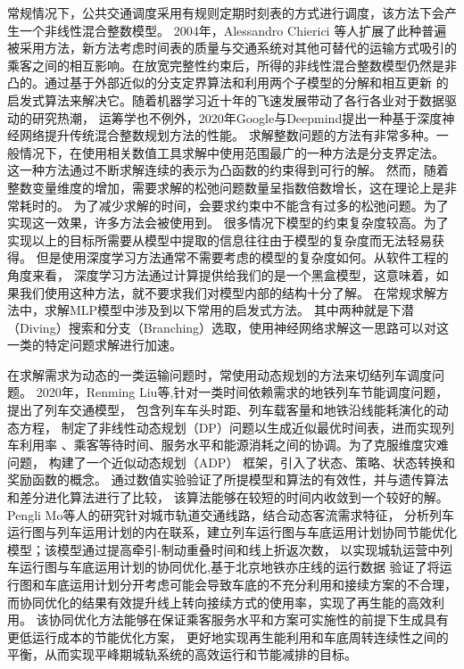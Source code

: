 常规情况下，公共交通调度采用有规则定期时刻表的方式进行调度，该方法下会产生一个非线性混合整数模型。
2004年，Alessandro Chierici
等人扩展了此种普遍被采用方法\cite{CHIERICI200499}，新方法考虑时间表的质量与交通系统对其他可替代的运输方式吸引的
乘客之间的相互影响。在放宽完整性约束后，所得的非线性混合整数模型仍然是非
凸的。通过基于外部近似的分支定界算法和利用两个子模型的分解和相互更新
的启发式算法来解决它。随着机器学习近十年的飞速发展带动了各行各业对于数据驱动的研究热潮，
运筹学也不例外，2020年Google与Deepmind提出一种基于深度神经网络提升传统混合整数规划方法的性能\cite{nair2021solving}。
求解整数问题的方法有非常多种。一般情况下，在使用相关数值工具求解中使用范围最广的一种方法是分支界定法。
这一种方法通过不断求解连续的表示为凸函数的约束得到可行的解。
然而，随着整数变量维度的增加，需要求解的松弛问题数量呈指数倍数增长，这在理论上是非常耗时的。
为了减少求解的时间，会要求约束中不能含有过多的松弛问题。为了实现这一效果，许多方法会被使用到。
很多情况下模型的约束复杂度较高。为了实现以上的目标所需要从模型中提取的信息往往由于模型的复杂度而无法轻易获得。
但是使用深度学习方法通常不需要考虑的模型的复杂度如何。从软件工程的角度来看，
深度学习方法通过计算提供给我们的是一个黑盒模型，这意味着，如果我们使用这种方法，就不要求我们对模型内部的结构十分了解。
在常规求解方法中，求解MLP模型中涉及到以下常用的启发式方法。
其中两种就是下潜（Diving）搜索和分支（Branching）选取，使用神经网络求解这一思路可以对这一类的特定问题求解进行加速。


在求解需求为动态的一类运输问题时，常使用动态规划的方法来切结列车调度问题。
2020年，Renming Liu等,针对一类时间依赖需求的地铁列车节能调度问题，提出了列车交通模型\cite{8337127}，
包含列车车头时距、列车载客量和地铁沿线能耗演化的动态方程，
制定了非线性动态规划（DP）问题以生成近似最优时间表，进而实现列车利用率
、乘客等待时间、服务水平和能源消耗之间的协调。为了克服维度灾难问题，
构建了一个近似动态规划（ADP） 框架，引入了状态、策略、状态转换和奖励函数的概念。
通过数值实验验证了所提模型和算法的有效性，并与遗传算法和差分进化算法进行了比较，
该算法能够在较短的时间内收敛到一个较好的解。Pengli Mo等人的研究\cite{8782134}针对城市轨道交通线路，结合动态客流需求特征，
分析列车运行图与列车运用计划的内在联系，建立列车运行图与车底运用计划协同节能优化模型；该模型通过提高牵引-制动重叠时间和线上折返次数，
以实现城轨运营中列车运行图与车底运用计划的协同优化,基于北京地铁亦庄线的运行数据
验证了将运行图和车底运用计划分开考虑可能会导致车底的不充分利用和接续方案的不合理，而协同优化的结果有效提升线上转向接续方式的使用率，实现了再生能的高效利用。
该协同优化方法能够在保证乘客服务水平和方案可实施性的前提下生成具有更低运行成本的节能优化方案，
更好地实现再生能利用和车底周转连续性之间的平衡，从而实现平峰期城轨系统的高效运行和节能减排的目标。


